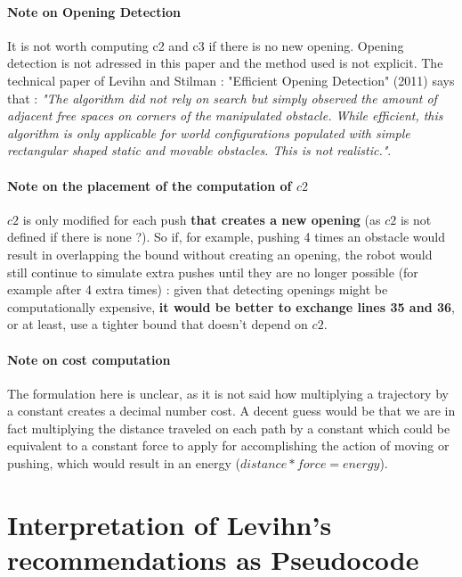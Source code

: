 \paragraph{Note on Opening Detection}\label{opening_detection_note} It is not worth computing c2 and c3 if there is no new opening. Opening detection is not adressed in this paper and the method used is not explicit. The technical paper of Levihn and Stilman : "Efficient Opening Detection" (2011) says that : \textit{"The algorithm did not rely on search but simply observed the amount of adjacent free spaces on corners of the manipulated obstacle. While efficient, this algorithm is only applicable for world configurations populated with simple rectangular shaped static and movable obstacles. This is not realistic."}.

\paragraph{Note on the placement of the computation of $c2$}\label{c2_computation_note} $c2$ is only modified for each push \textbf{that creates a new opening} (as $c2$ is not defined if there is none ?). So if, for example, pushing 4 times an obstacle would result in overlapping the bound without creating an opening, the robot would still continue to simulate extra pushes until they are no longer possible (for example after 4 extra times) : given that detecting openings might be computationally expensive, \textbf{it would be better to exchange lines 35 and 36}, or at least, use a tighter bound that doesn't depend on $c2$.

\paragraph{Note on cost computation}\label{cost_computation_note} The formulation here is unclear, as it is not said how multiplying a trajectory by a constant creates a decimal number cost. A decent guess would be that we are in fact multiplying the distance traveled on each path by a constant which could be equivalent to a constant force to apply for accomplishing the action of moving or pushing, which would result in an energy ($distance*force=energy$).



\clearpage

\section{Interpretation of Levihn's recommendations as Pseudocode}

